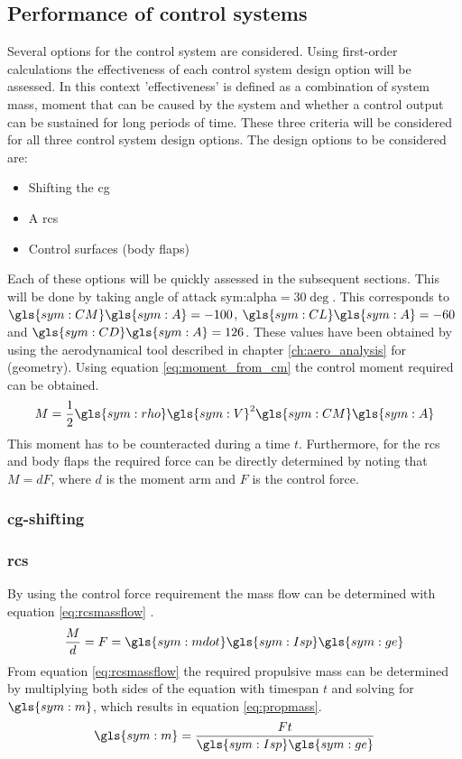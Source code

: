 \subsection{Performance of control systems}
 \label{sec:astroref}
Several options for the control system are considered. Using first-order calculations the effectiveness of each control system design option will be assessed. In this context 'effectiveness' is defined as a combination of system mass, moment that can be caused by the system and whether a control output can be sustained for long periods of time. These three criteria will be considered for all three control system design options. The design options to be considered are:
\begin{itemize}
	\item Shifting the \acrfull{cg}
	\item A \acrfull{rcs}
	\item Control surfaces (body flaps)
\end{itemize}
Each of these options will be quickly assessed in the subsequent sections. This will be done by taking angle of attack \gls{sym:alpha}$=30\deg$. This corresponds to $\gls{sym:CM}\gls{sym:A}=-100$, $\gls{sym:CL}\gls{sym:A}=-60$ and $\gls{sym:CD}\gls{sym:A}=126$. These values have been obtained by using the aerodynamical tool described in chapter \ref{ch:aero_analysis} for (geometry). Using equation \ref{eq:moment_from_cm} the control moment required can be obtained.
\begin{equation}
M=\frac{1}{2}\gls{sym:rho}\gls{sym:V}^{2}\gls{sym:CM}\gls{sym:A}
\label{eq:moment_from_cm}
\end{equation}
This moment has to be counteracted during a time $t$. Furthermore, for the \gls{rcs} and body flaps the required force can be directly determined by noting that $M=dF$, where $d$ is the moment arm and $F$ is the control force. 

\subsubsection{\gls{cg}-shifting}

\subsubsection{\acrlong{rcs}}
By using the control force requirement the mass flow can be determined with equation \ref{eq:rcsmassflow} \cite{Allen2012}.
\begin{equation}
\frac{M}{d}=F=\gls{sym:mdot}\gls{sym:Isp}\gls{sym:ge}
\end{equation}
From equation \ref{eq:rcsmassflow} the required propulsive mass can be determined by multiplying both sides of the equation with timespan $t$ and solving for $\gls{sym:m}$, which results in equation \ref{eq:propmass}.
\begin{equation}
\gls{sym:m}=\frac{Ft}{\gls{sym:Isp}\gls{sym:ge}}
\label{eq:propmass}
\end{equation}

